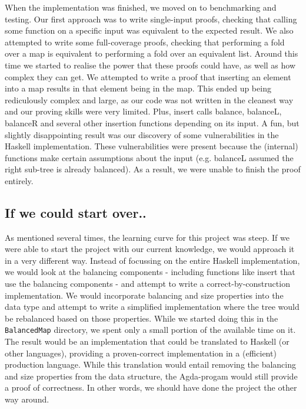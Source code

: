 \documentclass[a4paper,UKenglish,cleveref, autoref, thm-restate]{template/lipics-v2021}
\begin{document}
When the implementation was finished, we moved on to benchmarking and testing. Our first approach was to write single-input proofs, checking that calling some function on a specific input was equivalent to the expected result. We also attempted to write some full-coverage proofs, checking that performing a fold over a map is equivalent to performing a fold over an equivalent list. Around this time we started to realise the power that these proofs could have, as well as how complex they can get. We attempted to write a proof that inserting an element into a map results in that element being in the map. This ended up being rediculously complex and large, as our code was not written in the cleanest way and our proving skills were very limited. Plus, insert calls balance, balanceL, balanceR and several other insertion functions depending on its input. A fun, but slightly disappointing result was our discovery of some vulnerabilities in the Haskell implementation. These vulnerabilities were present because the (internal) functions make certain assumptions about the input (e.g. balanceL assumed the right sub-tree is already balanced). As a result, we were unable to finish the proof entirely.

\subsection{If we could start over..}
As mentioned several times, the learning curve for this project was steep. If we were able to start the project with our current knowledge, we would approach it in a very different way. Instead of focussing on the entire Haskell implementation, we would look at the balancing components - including functions like insert that use the balancing components - and attempt to write a correct-by-construction implementation. We would incorporate balancing and size properties into the data type and attempt to write a simplified implementation where the tree would be rebalanced based on those properties. While we started doing this in the \texttt{BalancedMap} directory, we spent only a small portion of the available time on it. The result would be an implementation that could be translated to Haskell (or other languages), providing a proven-correct implementation in a (efficient) production language. While this translation would entail removing the balancing and size properties from the data structure, the Agda-progam would still provide a proof of correctness. In other words, we should have done the project the other way around.
\end{document}
